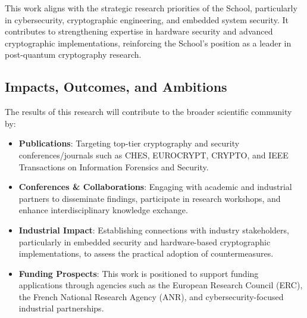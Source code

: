 \documentclass[11pt, a4paper]{article}
\begin{document}
This work aligns with the strategic research priorities of the School, particularly in cybersecurity, cryptographic engineering, and embedded system security. It contributes to strengthening expertise in hardware security and advanced cryptographic implementations, reinforcing the School’s position as a leader in post-quantum cryptography research.

\subsection*{Impacts, Outcomes, and Ambitions}

The results of this research will contribute to the broader scientific community by:

\begin{itemize}
    \item \textbf{Publications}: Targeting top-tier cryptography and security conferences/journals such as CHES, EUROCRYPT, CRYPTO, and IEEE Transactions on Information Forensics and Security.
    \item \textbf{Conferences \& Collaborations}: Engaging with academic and industrial partners to disseminate findings, participate in research workshops, and enhance interdisciplinary knowledge exchange.
    \item \textbf{Industrial Impact}: Establishing connections with industry stakeholders, particularly in embedded security and hardware-based cryptographic implementations, to assess the practical adoption of countermeasures.
    \item \textbf{Funding Prospects}: This work is positioned to support funding applications through agencies such as the European Research Council (ERC), the French National Research Agency (ANR), and cybersecurity-focused industrial partnerships.
\end{itemize}
\end{document}
